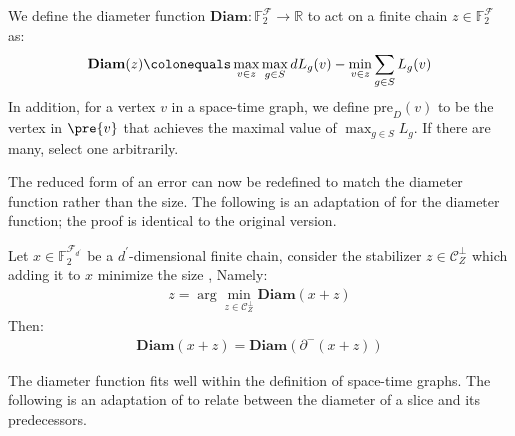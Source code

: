 

\newcommand{\diam}[1]{\textbf{Diam}(#1)}
\newcommand{\pred}[1]{\text{pre}_{D}(#1)}
\begin{definition}
  We define the diameter function $\textbf{Diam} \colon \mathbb{F}_{2}^{\mathcal{F}} \rightarrow \mathbb{R}$ to act on a finite chain $z \in \mathbb{F}_{2}^{\mathcal{F}}$ as:
  \begin{equation*}
    \begin{split}
      \diam{z } \colonequals \max_{v \in z}\max_{g \in S} d L_{g}(v) - \min_{v \in z}\sum_{g \in S} L_{g}(v) 
    \end{split}
  \end{equation*}
In addition, for a vertex $v$ in a space-time graph, we define $\pred{v}$ to be the vertex in $\pre{v}$ that achieves the maximal value of $\max_{g\in S}L_{g}$. If there are many, select one arbitrarily.
\end{definition}
The reduced form of an error can now be redefined to match the diameter function rather than the size. The following is an adaptation of  for the diameter function; the proof is identical to the original version.
\begin{claim}
  \label{claim:rereduced}
  Let $x \in \mathbb{F}_{2}^{\mathcal{F}_{d^{\prime}}}$ be a $d^{\prime}$-dimensional finite chain, consider the stabilizer  $z \in \mathcal{C}_{Z}^{\perp}$ which adding it to $x$ minimize the size , Namely: 
  \begin{equation*}
    \begin{split}
      z =  \arg \min_{z \in \mathcal{C}_{Z}^{\perp}} \diam{ x + z }  
    \end{split}
  \end{equation*}
  Then: 
  \begin{equation*}
    \begin{split}
      \diam{ x + z } = \diam{ \partial^{-}( x + z) } 
    \end{split}
  \end{equation*}
\end{claim}
The diameter function fits well within the definition of space-time graphs. The following is an adaptation of  to relate between the diameter of a slice and its predecessors.

